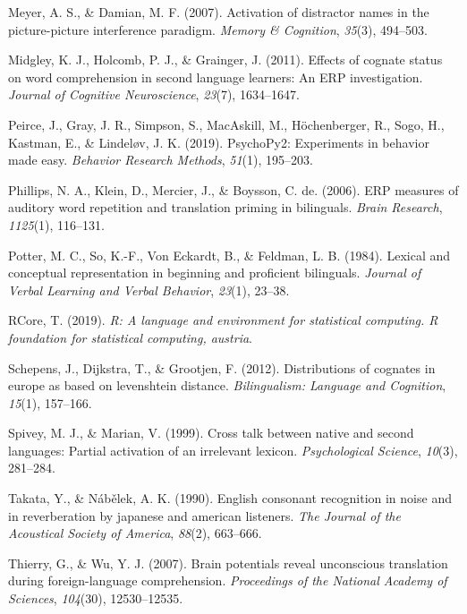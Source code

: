 \documentclass[
]{article}
\newlength{\cslhangindent}
\newenvironment{CSLReferences}[2] %
 {\begin{list}{}{%
  \setlength{\itemindent}{0pt}
  \setlength{\leftmargin}{0pt}
  \setlength{\parsep}{0pt}
  \ifodd #1
   \setlength{\leftmargin}{\cslhangindent}
   \setlength{\itemindent}{-1\cslhangindent}
  \fi
  \setlength{\itemsep}{#2\baselineskip}}}
 {\end{list}}
\begin{document}
\begin{CSLReferences}{1}{0}
Meyer, A. S., \& Damian, M. F. (2007). Activation of distractor names in
the picture-picture interference paradigm. \emph{Memory \& Cognition},
\emph{35}(3), 494--503.

Midgley, K. J., Holcomb, P. J., \& Grainger, J. (2011). Effects of
cognate status on word comprehension in second language learners: An ERP
investigation. \emph{Journal of Cognitive Neuroscience}, \emph{23}(7),
1634--1647.

Peirce, J., Gray, J. R., Simpson, S., MacAskill, M., Höchenberger, R.,
Sogo, H., Kastman, E., \& Lindeløv, J. K. (2019). PsychoPy2: Experiments
in behavior made easy. \emph{Behavior Research Methods}, \emph{51}(1),
195--203.

Phillips, N. A., Klein, D., Mercier, J., \& Boysson, C. de. (2006). ERP
measures of auditory word repetition and translation priming in
bilinguals. \emph{Brain Research}, \emph{1125}(1), 116--131.

Potter, M. C., So, K.-F., Von Eckardt, B., \& Feldman, L. B. (1984).
Lexical and conceptual representation in beginning and proficient
bilinguals. \emph{Journal of Verbal Learning and Verbal Behavior},
\emph{23}(1), 23--38.

RCore, T. (2019). \emph{R: A language and environment for statistical
computing. R foundation for statistical computing, austria}.

Schepens, J., Dijkstra, T., \& Grootjen, F. (2012). Distributions of
cognates in europe as based on levenshtein distance. \emph{Bilingualism:
Language and Cognition}, \emph{15}(1), 157--166.

Spivey, M. J., \& Marian, V. (1999). Cross talk between native and
second languages: Partial activation of an irrelevant lexicon.
\emph{Psychological Science}, \emph{10}(3), 281--284.

Takata, Y., \& Nábělek, A. K. (1990). English consonant recognition in
noise and in reverberation by japanese and american listeners. \emph{The
Journal of the Acoustical Society of America}, \emph{88}(2), 663--666.

Thierry, G., \& Wu, Y. J. (2007). Brain potentials reveal unconscious
translation during foreign-language comprehension. \emph{Proceedings of
the National Academy of Sciences}, \emph{104}(30), 12530--12535.


\end{CSLReferences}
\end{document}
